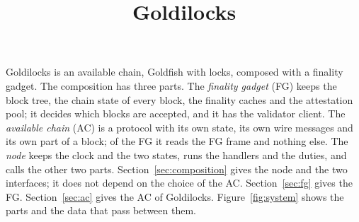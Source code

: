 \documentclass{article}
\title{Goldilocks}
\author{}
\date{}
\begin{document}
\maketitle

Goldilocks is an available chain, Goldfish with locks, composed with a
finality gadget.  The composition has three parts.  The \emph{finality gadget} (FG) keeps the
block tree, the chain state of every block, the finality caches and the
attestation pool; it decides which blocks are accepted, and it has the
validator client.  The \emph{available chain} (AC) is a protocol with its
own state, its own wire messages and its own part of a block; of the FG it
reads the FG frame and nothing else.  The \emph{node} keeps the clock and
the two states, runs the handlers and the duties, and calls the other two
parts.  Section~\ref{sec:composition} gives the node and the two
interfaces; it does not depend on the choice of the AC.
Section~\ref{sec:fg} gives the FG.  Section~\ref{sec:ac} gives the AC of
Goldilocks.  Figure~\ref{fig:system} shows the parts and the data
that pass between them.
\end{document}
